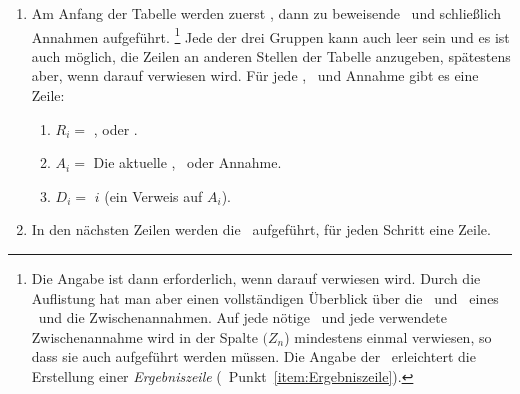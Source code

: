 \begin{enumerate}
	\item Am Anfang der Tabelle werden zuerst \Praemissen, dann zu beweisende \Konklusionen\ und schließlich Annahmen aufgeführt.%
	\footnote{%
		Die Angabe ist dann erforderlich, wenn darauf verwiesen wird.
		Durch die Auflistung hat man aber einen vollständigen Überblick über die \Praemissen\ und \Konklusionen\ eines \Beweises\ und die Zwischenannahmen.
		Auf jede nötige \Praemisse\ und jede verwendete Zwischenannahme wird in der Spalte $(Z_n$) mindestens einmal verwiesen, so dass sie auch aufgeführt werden müssen.
		Die Angabe der \Konklusionen\ erleichtert die Erstellung einer \emph{Ergebniszeile} (\seename\ Punkt~\ref{item:Ergebniszeile}).
	}
	Jede der drei Gruppen kann auch leer sein und es ist auch möglich, die Zeilen an anderen Stellen der Tabelle anzugeben, spätestens aber, wenn darauf verwiesen wird.
	Für jede \Praemisse, \Konklusion\ und Annahme gibt es eine Zeile:
	\begin{enumerate}
		\item $R_i =$ \strqt{\Praemisse}, \strqt{\Konklusion} oder .
		\item $A_i =$ Die aktuelle \Praemisse, \Konklusion\ oder Annahme.
		\item $D_i =$ $i$ \quad (ein Verweis auf $A_i$).
	\end{enumerate}
	\item In den nächsten Zeilen werden die \Beweisschritte\ aufgeführt, für jeden Schritt eine Zeile.


\end{enumerate}
